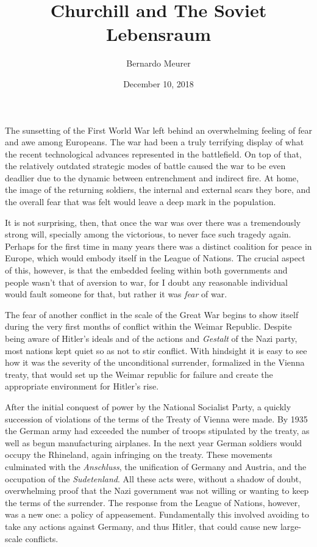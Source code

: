 \documentclass[12pt,letterpaper]{article}
\title{Churchill and The Soviet Lebensraum}
\author{Bernardo Meurer}
\date{December 10, 2018}
\begin{document}
\maketitle
\newpage
\begin{spacing}{2}
    The sunsetting of the First World War left behind an overwhelming feeling
    of fear and awe among Europeans. The war had been a truly terrifying
    display of what the recent technological advances represented in the
    battlefield. On top of that, the relatively outdated strategic modes of
    battle caused the war to be even deadlier due to the dynamic between
    entrenchment and indirect fire. At home, the image of the returning
    soldiers, the internal and external scars they bore, and the overall fear
    that was felt would leave a deep mark in the population.

    It is not surprising, then, that once the war was over there was a
    tremendously strong will, specially among the victorious, to never face such
    tragedy again. Perhaps for the first time in many years there was a distinct
    coalition for peace in Europe, which would embody itself in the League of
    Nations. The crucial aspect of this, however, is that the embedded feeling
    within both governments and people wasn't that of aversion to war, for I
    doubt any reasonable individual would fault someone for that, but rather it
    was \emph{fear} of war.

    The fear of another conflict in the scale of the Great War begins to show
    itself during the very first months of conflict within the Weimar Republic.
    Despite being aware of Hitler's ideals and of the actions and \emph{Gestalt}
    of the Nazi party, most nations kept quiet so as not to stir conflict. With
    hindsight it is easy to see how it was the severity of the unconditional
    surrender, formalized in the Vienna treaty, that would set up the Weimar
    republic for failure and create the appropriate environment for Hitler's
    rise.

    After the initial conquest of power by the National Socialist Party, a
    quickly succession of violations of the terms of the Treaty of Vienna were
    made. By 1935 the German army had exceeded the number of troops stipulated
    by the treaty, as well as begun manufacturing airplanes. In the next year
    German soldiers would occupy the Rhineland, again infringing on the treaty.
    These movements culminated with the \emph{Anschluss}, the unification of
    Germany and Austria, and the occupation of the \emph{Sudetenland}. All these
    acts were, without a shadow of doubt, overwhelming proof that the Nazi
    government was not willing or wanting to keep the terms of the surrender.
    The response from the League of Nations, however, was a new one: a policy of
    appeasement. Fundamentally this involved avoiding to take any actions
    against Germany, and thus Hitler, that could cause new large-scale
    conflicts.


\end{spacing}
\end{document}

